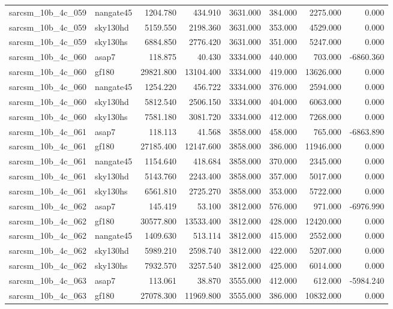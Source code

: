 \begin{tabular}{llrrrrrr}
sarcsm\_10b\_4c\_059 & nangate45 & 1204.780 & 434.910 & 3631.000 & 384.000 & 2275.000 & 0.000 \\
sarcsm\_10b\_4c\_059 & sky130hd & 5159.550 & 2198.360 & 3631.000 & 353.000 & 4529.000 & 0.000 \\
sarcsm\_10b\_4c\_059 & sky130hs & 6884.850 & 2776.420 & 3631.000 & 351.000 & 5247.000 & 0.000 \\
sarcsm\_10b\_4c\_060 & asap7 & 118.875 & 40.430 & 3334.000 & 440.000 & 703.000 & -6860.360 \\
sarcsm\_10b\_4c\_060 & gf180 & 29821.800 & 13104.400 & 3334.000 & 419.000 & 13626.000 & 0.000 \\
sarcsm\_10b\_4c\_060 & nangate45 & 1254.220 & 456.722 & 3334.000 & 376.000 & 2594.000 & 0.000 \\
sarcsm\_10b\_4c\_060 & sky130hd & 5812.540 & 2506.150 & 3334.000 & 404.000 & 6063.000 & 0.000 \\
sarcsm\_10b\_4c\_060 & sky130hs & 7581.180 & 3081.720 & 3334.000 & 412.000 & 7268.000 & 0.000 \\
sarcsm\_10b\_4c\_061 & asap7 & 118.113 & 41.568 & 3858.000 & 458.000 & 765.000 & -6863.890 \\
sarcsm\_10b\_4c\_061 & gf180 & 27185.400 & 12147.600 & 3858.000 & 386.000 & 11946.000 & 0.000 \\
sarcsm\_10b\_4c\_061 & nangate45 & 1154.640 & 418.684 & 3858.000 & 370.000 & 2345.000 & 0.000 \\
sarcsm\_10b\_4c\_061 & sky130hd & 5143.760 & 2243.400 & 3858.000 & 357.000 & 5017.000 & 0.000 \\
sarcsm\_10b\_4c\_061 & sky130hs & 6561.810 & 2725.270 & 3858.000 & 353.000 & 5722.000 & 0.000 \\
sarcsm\_10b\_4c\_062 & asap7 & 145.419 & 53.100 & 3812.000 & 576.000 & 971.000 & -6976.990 \\
sarcsm\_10b\_4c\_062 & gf180 & 30577.800 & 13533.400 & 3812.000 & 428.000 & 12420.000 & 0.000 \\
sarcsm\_10b\_4c\_062 & nangate45 & 1409.630 & 513.114 & 3812.000 & 415.000 & 2552.000 & 0.000 \\
sarcsm\_10b\_4c\_062 & sky130hd & 5989.210 & 2598.740 & 3812.000 & 422.000 & 5207.000 & 0.000 \\
sarcsm\_10b\_4c\_062 & sky130hs & 7932.570 & 3257.540 & 3812.000 & 425.000 & 6014.000 & 0.000 \\
sarcsm\_10b\_4c\_063 & asap7 & 113.061 & 38.870 & 3555.000 & 412.000 & 612.000 & -5984.240 \\
sarcsm\_10b\_4c\_063 & gf180 & 27078.300 & 11969.800 & 3555.000 & 386.000 & 10832.000 & 0.000 \\

\end{tabular}
